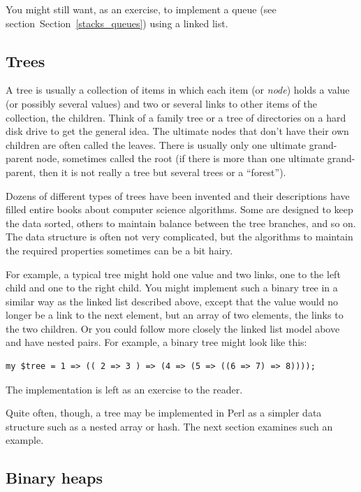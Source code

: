You might still want, as an exercise, to implement a queue 
(see section~Section~\ref{stacks_queues}) using a linked list. 

\subsection{Trees}
\label{tree}

A tree is usually a collection of items in which each 
item (or \emph{node}) holds a value (or possibly 
several values) and two or several 
links to other items of the collection, the children. Think 
of a family tree or a tree of directories on a hard disk 
drive to get the general idea. The ultimate 
nodes that don't have their own children are often called 
the leaves. There is usually only one ultimate grand-parent 
node, sometimes called the root (if there is more than one 
ultimate grand-parent, then it is not really a tree but 
several trees or a ``forest'').

Dozens of different types of trees have been invented and 
their descriptions have filled entire books about computer 
science algorithms. Some are designed 
to keep the data sorted, others to maintain balance between 
the tree branches, and so on. The data structure is often 
not very complicated, but the algorithms to maintain the 
required properties sometimes can be a bit hairy.

For example, a 
typical tree might hold one value and two links, one to 
the left child and one to the right child. You 
might implement such a binary tree in a similar way as the 
linked list described above, except that the value 
would no longer be a link to the next element, but an 
array of two elements, the links to the two children. 
Or you could follow more closely the linked list model 
above and have nested pairs. For example, a binary tree 
might look like this:

\begin{verbatim}
my $tree = 1 => (( 2 => 3 ) => (4 => (5 => ((6 => 7) => 8))));
\end{verbatim}

The implementation is left as an exercise to the reader. 

Quite often, though, a tree may be implemented in Perl 
as a simpler data structure such as a nested array or hash. 
The next section examines such an example.

\subsection{Binary heaps}
\label{heap}

